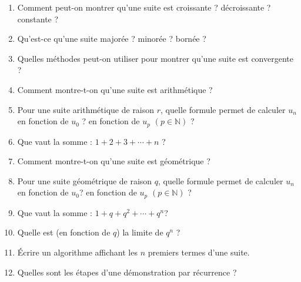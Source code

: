 
%
\begin{enumerate}
     \item %
     Comment peut-on montrer qu'une suite est croissante ? décroissante ? constante ?
     \item %
     Qu'est-ce qu'une suite majorée ? minorée ? bornée ?
     \item %
     Quelles méthodes peut-on utiliser pour montrer qu'une suite est convergente ?
     \item %
     Comment montre-t-on qu'une suite est arithmétique ?
     \item %
     Pour une suite arithmétique de raison $r$, quelle formule permet de calculer $u_n$ en fonction de $u_0 $ ? en fonction de $u_p$  $(p \in \mathbb{N})$ ?
     \item %
     Que vaut la somme : $1+2+3+\cdots+n$ ?
     \item %
     Comment montre-t-on qu'une suite est géométrique ?
     \item %
     Pour une suite géométrique de raison $q$, quelle formule permet de calculer $u_n$ en fonction de $u_0 $? en fonction de $u_p$  $(p \in \mathbb{N})$ ?
     \item %
     Que vaut la somme : $1+q+q^2+\cdots+q^n $?
     \item %
     Quelle est (en fonction de $q$) la limite de $q^n$ ?
     \item %
     Écrire un algorithme affichant les $n$ premiers termes d'une suite.
     \item %
     Quelles sont les étapes d'une démonstration par récurrence ?
\end{enumerate}
